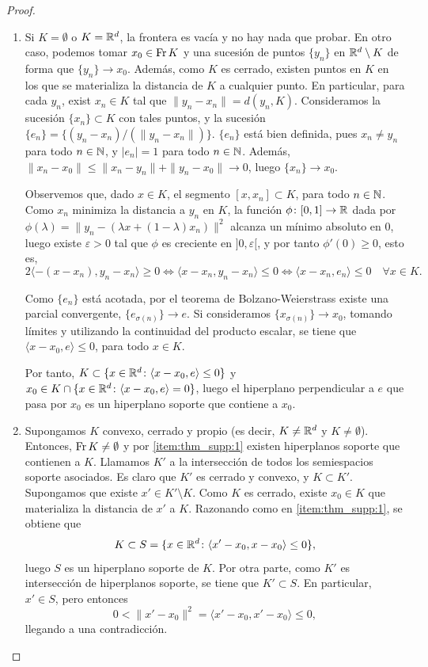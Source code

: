 \documentclass{book}
\begin{document}
\begin{proof}~
    \begin{enumerate}
    	\item Si $K = \emptyset$ o $K = \mathbb{R}^d$, la frontera es vacía y no hay nada que probar. En otro caso, podemos tomar $x_0 \in \operatorname{Fr} K$ y una sucesión de puntos $\{y_n\}$ en $\mathbb{R}^d \setminus K$ de forma que $\{y_n\} \to x_0$. Además, como $K$ es cerrado, existen puntos en $K$ en los que se materializa la distancia de $K$ a cualquier punto. En particular, para cada $y_n$, exist $x_n \in K$ tal que $\|y_n - x_n\| = d(y_n,K)$. Consideramos la sucesión $\{x_n\} \subset K$ con tales puntos, y la sucesión $\{e_n\} = \{(y_n-x_n)/(\|y_n - x_n\|) \}$. $\{e_n\}$ está bien definida, pues $x_n \ne y_n$ para todo $n \in \mathbb{N}$, y $|e_n| = 1$ para todo $n \in \mathbb{N}$. Además, $\|x_n - x_0\| \le \|x_n - y_n\| + \|y_n - x_0\| \to 0$, luego $\{x_n\} \to x_0$.

    	Observemos que, dado $x \in K$, el segmento $[x,x_n] \subset K$, para todo $n \in \mathbb{N}$. Como $x_n$ minimiza la distancia a $y_n$ en $K$, la función $\phi\colon [0,1] \to \mathbb{R}$ dada por $\phi(\lambda) = \|y_n - (\lambda x + (1-\lambda)x_n)\|^2$ alcanza un mínimo absoluto en 0, luego existe $\varepsilon > 0$ tal que $\phi$ es creciente en $]0,\varepsilon[$, y por tanto $\phi'(0) \ge 0$, esto es, 
    	\[2\langle -(x-x_n),y_n-x_n \rangle \ge 0 \iff \langle x - x_n, y_n - x_n \rangle \le 0 \iff \langle x - x_n, e_n \rangle \le 0 \quad \forall x \in K. \]

    	Como $\{e_n\}$ está acotada, por el teorema de Bolzano-Weierstrass existe una parcial convergente, $\{e_{\sigma(n)}\} \to e$. Si consideramos $\{x_{\sigma(n)}\} \to x_0$, tomando límites y utilizando la continuidad del producto escalar, se tiene que $\langle x - x_0, e \rangle \le 0$, para todo $x \in K$.

    	Por tanto, $K \subset \{x\in\mathbb{R}^d \colon \langle x - x_0, e \rangle \le 0 \}$ y $x_0 \in K \cap \{x \in \mathbb{R}^d \colon \langle x - x_0, e \rangle = 0\}$, luego el hiperplano perpendicular a $e$ que pasa por $x_0$ es un hiperplano soporte que contiene a $x_0$.

    	\item Supongamos $K$ convexo, cerrado y propio (es decir, $K \ne \mathbb{R}^d$ y $K \ne \emptyset$). Entonces, $\operatorname{Fr} K \ne \emptyset$ y por \ref{item:thm_supp:1} existen hiperplanos soporte que contienen a $K$. Llamamos $K'$ a la intersección de todos los semiespacios soporte asociados. Es claro que $K'$ es cerrado y convexo, y $K \subset K'$. Supongamos que existe $x' \in K' \setminus K$. Como $K$ es cerrado, existe $x_0 \in K$ que materializa la distancia de $x'$ a $K$. Razonando como en \ref{item:thm_supp:1}, se obtiene que
    	\[ K \subset S = \{x \in \mathbb{R}^d \colon \langle x' - x_0, x - x_0 \rangle \le 0 \}, \]
    	luego $S$ es un hiperplano soporte de $K$. Por otra parte, como $K'$ es intersección de hiperplanos soporte, se tiene que $K' \subset S$. En particular, $x' \in S$, pero entonces
    	\[ 0 < \|x' - x_0\|^2 = \langle x' - x_0, x' - x_0 \rangle \le 0, \]
    	llegando a una contradicción.


\end{enumerate}
\end{proof}
\end{document}

